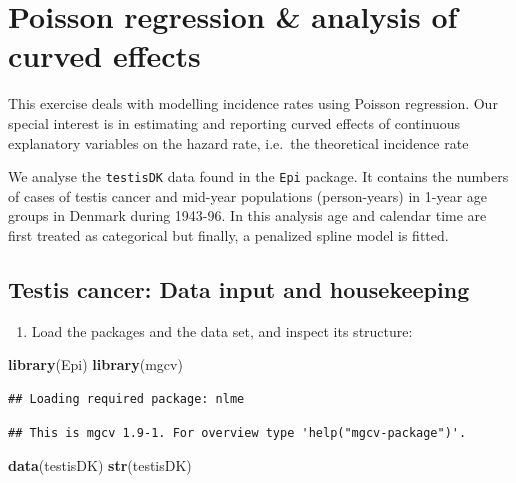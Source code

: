 \documentclass[
]{book}
\newenvironment{Shaded}{\begin{snugshade}}{\end{snugshade}}
\newcommand{\FunctionTok}[1]{\textcolor[rgb]{0.13,0.29,0.53}{\textbf{#1}}}
\newcommand{\NormalTok}[1]{#1}
\providecommand{\tightlist}{%
  \setlength{\itemsep}{0pt}\setlength{\parskip}{0pt}}
\begin{document}
\chapter{Poisson regression \& analysis of curved effects}\label{poisson-regression-analysis-of-curved-effects}

This exercise deals with modelling incidence rates
using Poisson regression. Our special interest is in
estimating and reporting curved effects of continuous
explanatory variables on the hazard rate, i.e.~the theoretical incidence rate

We analyse the \texttt{testisDK} data found in the
\texttt{Epi} package.
It contains the numbers of cases of testis cancer and mid-year
populations (person-years) in 1-year age groups in Denmark during
1943-96. In this analysis age and calendar time
are first treated as categorical
but finally, a penalized spline model is fitted.

\section{Testis cancer: Data input and housekeeping}\label{testis-cancer-data-input-and-housekeeping}

\begin{enumerate}
\def\labelenumi{\arabic{enumi}.}
\tightlist
\item
  Load the packages and the data set, and inspect its structure:
\end{enumerate}

\begin{Shaded}
\begin{Highlighting}[]
\FunctionTok{library}\NormalTok{(Epi)}
\FunctionTok{library}\NormalTok{(mgcv)}
\end{Highlighting}
\end{Shaded}

\begin{verbatim}
## Loading required package: nlme
\end{verbatim}

\begin{verbatim}
## This is mgcv 1.9-1. For overview type 'help("mgcv-package")'.
\end{verbatim}

\begin{Shaded}
\begin{Highlighting}[]
\FunctionTok{data}\NormalTok{(testisDK)}
\FunctionTok{str}\NormalTok{(testisDK)}
\end{Highlighting}
\end{Shaded}
\end{document}
